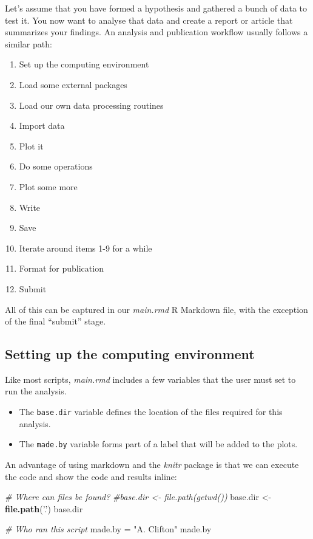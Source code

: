 \documentclass[11pt,]{article}
\newenvironment{Shaded}{\begin{snugshade}}{\end{snugshade}}
\newcommand{\CommentTok}[1]{\textcolor[rgb]{0.56,0.35,0.01}{\textit{#1}}}
\newcommand{\KeywordTok}[1]{\textcolor[rgb]{0.13,0.29,0.53}{\textbf{#1}}}
\newcommand{\NormalTok}[1]{#1}
\newcommand{\StringTok}[1]{\textcolor[rgb]{0.31,0.60,0.02}{#1}}
\providecommand{\tightlist}{%
  \setlength{\itemsep}{0pt}\setlength{\parskip}{0pt}}
\begin{document}
Let's assume that you have formed a hypothesis and gathered a bunch of data to test it. You now want to analyse that data and create a report or article that summarizes your findings. An analysis and publication workflow usually follows a similar path:

\begin{enumerate}
\def\labelenumi{\arabic{enumi}.}
\tightlist
\item
  Set up the computing environment
\item
  Load some external packages
\item
  Load our own data processing routines
\item
  Import data
\item
  Plot it
\item
  Do some operations
\item
  Plot some more
\item
  Write
\item
  Save
\item
  Iterate around items 1-9 for a while
\item
  Format for publication
\item
  Submit
\end{enumerate}

All of this can be captured in our \emph{main.rmd} R Markdown file, with the exception of the final ``submit'' stage.

\hypertarget{setting-up-the-computing-environment}{%
\subsection{Setting up the computing environment}\label{setting-up-the-computing-environment}}

Like most scripts, \emph{main.rmd} includes a few variables that the user must set to run the analysis.

\begin{itemize}
\tightlist
\item
  The \texttt{base.dir} variable defines the location of the files required for this analysis.
\item
  The \texttt{made.by} variable forms part of a label that will be added to the plots.
\end{itemize}

An advantage of using markdown and the \emph{knitr} package is that we can execute the code and show the code and results inline:

\begin{Shaded}
\begin{Highlighting}[]
\CommentTok{# Where can files be found?}
\CommentTok{#base.dir <- file.path(getwd())}
\NormalTok{base.dir <-}\KeywordTok{file.path}\NormalTok{(}\StringTok{'.'}\NormalTok{)}
\NormalTok{base.dir}

\CommentTok{# Who ran this script}
\NormalTok{made.by =}\StringTok{ "A. Clifton"}
\NormalTok{made.by}
\end{Highlighting}
\end{Shaded}
\end{document}
